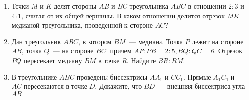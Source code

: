 \documentclass{article}
\begin{document}
\begin{enumerate}[label*=\protect\fbox{\arabic{enumi}}]
\item Точки $M$ и $K$ делят стороны $AB$ и $BC$ треугольника $ABC$ в отношении $2 : 3$ и $4 : 1$, считая от их общей вершины. В каком отношении делится отрезок $MK$ медианой треугольника, проведенной к стороне $AC$?

\item Дан треугольник $ABC$, в котором $BM$~--- медиана. Точка $P$ лежит на стороне $AB$, точка $Q$~--- на стороне $BC$, причем $AP : PB = 2 : 5, BQ : QC = 6$. Отрезок $PQ$ пересекает
медиану $BM$ в точке $R$. Найдите $BR:RM$.

\item В треугольнике $ABC$ проведены биссектрисы $AA_1$ и $CC_1$. Прямые $A_1C_1$ и $AC$ пересекаются в точке $D$. Докажите, что $BD$~--- внешняя биссектриса угла $AB$

\end{enumerate}
\end{document}
